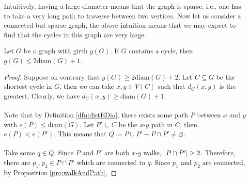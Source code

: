 \documentclass[math, code]{amznotes}
\theoremstyle{remark}
\begin{document}
Intuitively, having a large diameter means that the graph is sparse, i.e., one has to take a very long path to traverse between two vertices. Now let us consider a connected but sparse graph, the above intuition means that we may expect to find that the cycles in this graph are very large.
\begin{probox}{}{}
    Let $G$ be a graph with girth $g(G)$. If $G$ contains a cycle, then $g(G) \leq 2\mathrm{diam}(G) + 1$.
    \tcblower
    \begin{proof}
        Suppose on contrary that $g(G) \geq 2\mathrm{diam}(G) + 2$. Let $C \subseteq G$ be the shortest cycle in $G$, then we can take $x, y \in V(C)$ such that $d_C(x, y)$ is the greatest. Clearly, we have $d_C(x, y) \geq \mathrm{diam}(G) + 1$.
        \\\\
        Note that by Definition \ref{dfn:distEDia}, there exists some path $P$ between $x$ and $y$ with $e(P) \leq \mathrm{diam}(G)$. Let $P' \subseteq C$ be the $x$-$y$ path in $C$, then $e(P) < e(P')$. This means that $Q \coloneqq P \cup P' - P \cap P' \neq \varnothing$.
        \\\\
        Take some $q \in Q$. Since $P$ and $P'$ are both $x$-$y$ walks, ${\left\lvert {P \cap P'} \right\rvert} \geq 2$. Therefore, there are $p_1, p_2 \in P \cap P'$ which are connected to $q$. Since $p_1$ and $p_2$ are connected, by Proposition \ref{pro:walkAndPath}, 
    \end{proof}
\end{probox}
\end{document}
